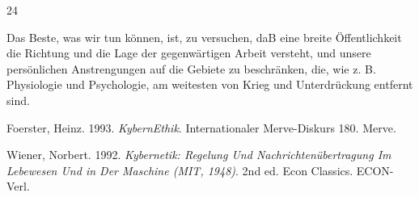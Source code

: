 \documentclass[
  letterpaper,
  DIV=11,
  numbers=noendperiod]{scrartcl}
\newlength{\cslhangindent}
\newenvironment{CSLReferences}[2] %
 {\begin{list}{}{%
  \setlength{\itemindent}{0pt}
  \setlength{\leftmargin}{0pt}
  \setlength{\parsep}{0pt}
  \ifodd #1
   \setlength{\leftmargin}{\cslhangindent}
   \setlength{\itemindent}{-1\cslhangindent}
  \fi
  \setlength{\itemsep}{#2\baselineskip}}}
 {\end{list}}
\begin{document}
24

Das Beste, was wir tun können, ist, zu versuchen, daB eine breite
Öffentlichkeit die Richtung und die Lage der gegenwärtigen Arbeit
versteht, und unsere persönlichen Anstrengungen auf die Gebiete zu
beschränken, die, wie z. B. Physiologie und Psychologie, am weitesten
von Krieg und Unterdrückung entfernt sind.

\protect{}\label{refs}
\begin{CSLReferences}{1}{1}
Foerster, Heinz. 1993. \emph{{KybernEthik}}. Internationaler
{Merve}-{Diskurs} 180. Merve.

Wiener, Norbert. 1992. \emph{Kybernetik: {Regelung} Und
{Nachrichtenübertragung} Im {Lebewesen} Und in Der {Maschine} ({MIT},
1948)}. 2nd ed. Econ Classics. ECON-Verl.

\end{CSLReferences}
\end{document}
